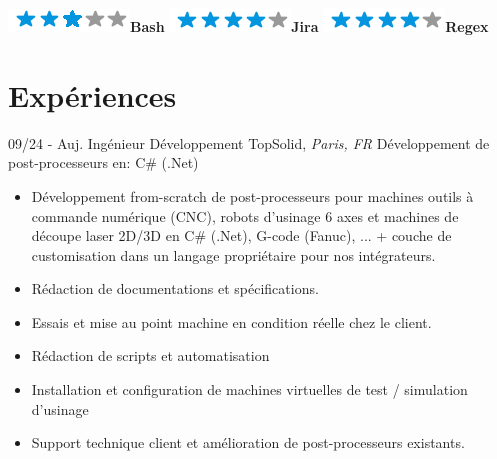 \documentclass[]{friggeri-cv}
\begin{document}
\begin{flushleft}
\begin{multicols}{3}
\begin{itemize}
\begin{flushleft}
\includegraphics[scale=0.40]{res/img/3stars.png}\hspace{1.5mm}\textbf{Bash}
\includegraphics[scale=0.40]{res/img/4stars.png}\hspace{1.5mm}\textbf{Jira}
\includegraphics[scale=0.40]{res/img/4stars.png}\hspace{1.5mm}\textbf{Regex}
\end{flushleft}            


        \end{itemize}
        \end{multicols}
        \end{flushleft} \normalsize
        \vspace*{-0.65cm}
\section{Expériences}
\vspace*{-0.25cm}

\begin{entrylist}
  \entry
    {09/24 - Auj.}
    {Ingénieur Développement}
    {TopSolid, \textit{Paris, FR}}
    {Développement de post-processeurs en:  C\# (.Net)}
\end{entrylist}
\vspace{-15pt}

\vspace{0.5mm}
\begin{itemize}
\setlength{\itemsep}{1pt}
\setlength{\parskip}{0pt}
\setlength{\parsep}{0pt}

\item Développement from-scratch de post-processeurs pour machines outils à commande numérique (CNC), robots d'usinage 6 axes et machines de découpe laser 2D/3D en C\# (.Net), G-code (Fanuc), ... + couche de customisation dans un langage propriétaire pour nos intégrateurs.
\item Rédaction de documentations et spécifications.
\item Essais et mise au point machine en condition réelle chez le client.
\item Rédaction de scripts et automatisation
\item Installation et configuration de machines virtuelles de test / simulation d'usinage
\item Support technique client et amélioration de post-processeurs existants.
\end{itemize}
\end{document}
